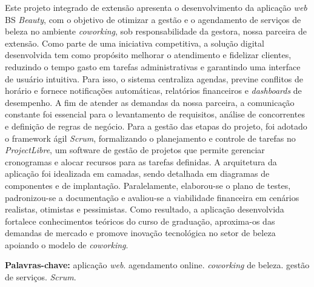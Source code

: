 	\begin{resumo}
	Este projeto integrado de extensão apresenta o desenvolvimento da aplicação \emph{web} BS \emph{Beauty}, com o objetivo de otimizar a gestão e o agendamento de serviços de beleza no ambiente \emph{coworking}, sob responsabilidade da gestora, nossa parceira de extensão. Como parte de uma iniciativa competitiva, a solução digital desenvolvida tem como propósito melhorar o atendimento e fidelizar clientes, reduzindo o tempo gasto em tarefas administrativas e garantindo uma interface de usuário intuitiva. Para isso, o sistema centraliza agendas, previne conflitos de horário e fornece notificações automáticas, relatórios financeiros e \emph{dashboards} de desempenho. A fim de atender as demandas da nossa parceira, a comunicação constante foi essencial para o levantamento de requisitos, análise de concorrentes e definição de regras de negócio. Para a gestão das etapas do projeto, foi adotado o framework ágil \emph{Scrum}, formalizando o planejamento e controle de tarefas no \emph{ProjectLibre}, um software de gestão de projetos que permite gerenciar cronogramas e alocar recursos para as tarefas definidas. A arquitetura da aplicação foi idealizada em camadas, sendo detalhada em diagramas de componentes e de implantação. Paralelamente, elaborou-se o plano de testes, padronizou-se a documentação e avaliou-se a viabilidade financeira em cenários realistas, otimistas e pessimistas. Como resultado, a aplicação desenvolvida fortalece conhecimentos teóricos do curso de graduação, aproxima-os das demandas de mercado e promove inovação tecnológica no setor de beleza apoiando o modelo de \emph{coworking}.

\textbf{Palavras-chave:} aplicação \emph{web}. agendamento online. \emph{coworking} de beleza. gestão de serviços. \emph{Scrum}.

	\end{resumo}